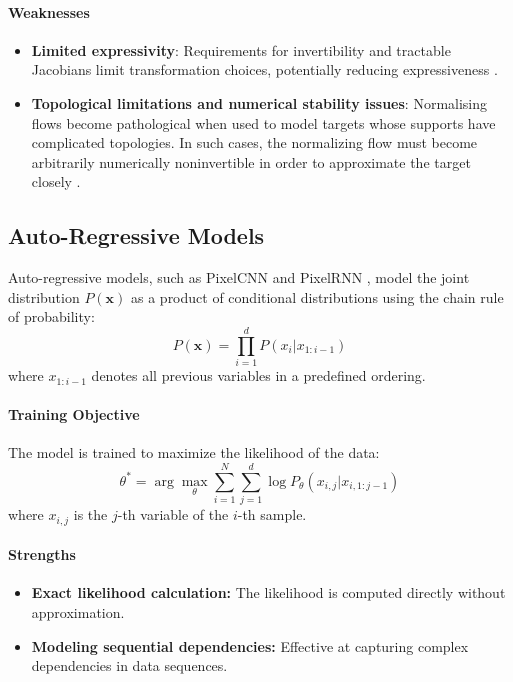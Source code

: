 \paragraph{Weaknesses}

\begin{itemize}
    \item \textbf{Limited expressivity}: Requirements for invertibility and tractable Jacobians limit transformation choices, potentially reducing expressiveness \cite{papamakarios2019normalizing}.
    \item \textbf{Topological limitations and numerical stability issues}: Normalising flows become pathological when used to model targets whose supports have complicated topologies. In such cases, the normalizing flow must become arbitrarily numerically noninvertible in order to approximate the target closely \cite{behrmann2021understanding, cornish2020relaxing}.
\end{itemize}

\subsection{Auto-Regressive Models}
Auto-regressive models, such as PixelCNN and PixelRNN \cite{oord2016pixel}, model the joint distribution \( P(\mathbf{x}) \) as a product of conditional distributions using the chain rule of probability:
\[
P(\mathbf{x}) = \prod_{i=1}^{d} P(x_i | x_{1:i-1})
\]
where \( x_{1:i-1} \) denotes all previous variables in a predefined ordering.

\paragraph{Training Objective}
The model is trained to maximize the likelihood of the data:
\[
\theta^* = \arg \max_{\theta} \sum_{i=1}^{N} \sum_{j=1}^{d} \log P_{\theta}(x_{i,j} | x_{i,1:j-1})
\]
where \( x_{i,j} \) is the \( j \)-th variable of the \( i \)-th sample.

\paragraph{Strengths}
\begin{itemize}
    \item \textbf{Exact likelihood calculation:} The likelihood is computed directly without approximation.
    \item \textbf{Modeling sequential dependencies:} Effective at capturing complex dependencies in data sequences.
\end{itemize}

